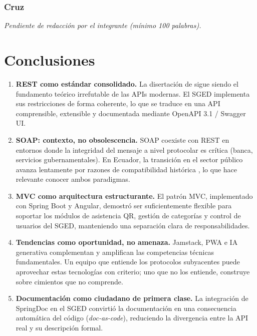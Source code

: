\documentclass[12pt,a4paper]{article}
\begin{document}
\subsubsection*{Cruz}

\textit{Pendiente de redacción por el integrante (mínimo 100 palabras).}

\section{Conclusiones}
\label{sec:conclusiones}

\begin{enumerate}
  \item \textbf{REST como estándar consolidado.}
    La disertación de \textcite{fielding2000} sigue siendo el fundamento teórico
    irrefutable de las APIs modernas.
    El SGED implementa sus restricciones de forma coherente, lo que se traduce en una API
    comprensible, extensible y documentada mediante OpenAPI 3.1 / Swagger UI.

  \item \textbf{SOAP: contexto, no obsolescencia.}
    SOAP coexiste con REST en entornos donde la integridad del mensaje a nivel protocolar
    es crítica (banca, servicios gubernamentales).
    En Ecuador, la transición en el sector público avanza lentamente por razones de
    compatibilidad histórica \parencite{garriga2021}, lo que hace relevante conocer ambos
    paradigmas.

  \item \textbf{MVC como arquitectura estructurante.}
    El patrón MVC, implementado con Spring Boot y Angular, demostró ser suficientemente
    flexible para soportar los módulos de asistencia QR, gestión de categorías y control
    de usuarios del SGED, manteniendo una separación clara de responsabilidades.

  \item \textbf{Tendencias como oportunidad, no amenaza.}
    Jamstack, PWA e IA generativa complementan y amplifican las competencias técnicas
    fundamentales.
    Un equipo que entiende los protocolos subyacentes puede aprovechar estas tecnologías
    con criterio; uno que no los entiende, construye sobre cimientos que no comprende.

  \item \textbf{Documentación como ciudadano de primera clase.}
    La integración de SpringDoc en el SGED convirtió la documentación en una consecuencia
    automática del código (\textit{doc-as-code}), reduciendo la divergencia entre la API
    real y su descripción formal.
\end{enumerate}
\end{document}
